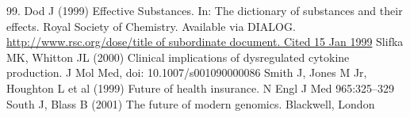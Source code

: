 \begin{thebibliography}{99.}
%
 Dod J (1999) Effective Substances. In: The dictionary of substances and their effects. Royal Society of Chemistry. Available via DIALOG. \\
\url{http://www.rsc.org/dose/title of subordinate document. Cited 15 Jan 1999}
%
 Slifka MK, Whitton JL (2000) Clinical implications of dysregulated cytokine production. J Mol Med, doi: 10.1007/s001090000086
%
 Smith J, Jones M Jr, Houghton L et al (1999) Future of health insurance. N Engl J Med 965:325--329
%
 South J, Blass B (2001) The future of modern genomics. Blackwell, London 
%
\end{thebibliography}
